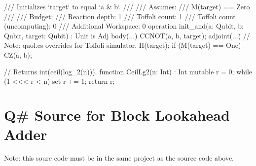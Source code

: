 \documentclass[onecolumn,unpublished]{quantumarticle}
\theoremstyle{definition}
\theoremstyle{definition}
\theoremstyle{definition}
\begin{document}
\begin{qsharp}
{    /// Initializes `target` to equal `a & b`.
    ///
    /// Assumes:
    ///     M(target) == Zero
    ///
    /// Budget:
    ///     Reaction depth: 1
    ///     Toffoli count: 1
    ///     Toffoli count (uncomputing): 0
    ///     Additional Workspace: 0
    operation init_and(a: Qubit, b: Qubit, target: Qubit) : Unit is Adj {
        body(...) {
            CCNOT(a, b, target);
        }
        adjoint(...) {
            // Note: quol.cs overrides for Toffoli simulator.
            H(target);
            if (M(target) == One) {
                CZ(a, b);
            }
        }
    }

    // Returns int(ceil(log_2(n))).
    function CeilLg2(n: Int) : Int {
        mutable r = 0;
        while (1 <<< r < n) {
            set r += 1;
        }
        return r;
    }
}
\end{qsharp}

\section{Q\# Source for Block Lookahead Adder}

Note: this soure code must be in the same project as the source code above.
\end{document}
